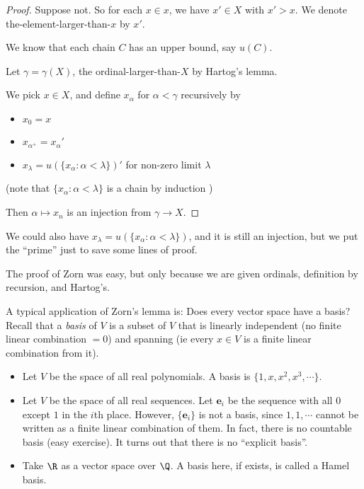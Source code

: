 \documentclass[a4paper]{article}
\begin{document}
\begin{proof}
  Suppose not. So for each $x\in x$, we have $x'\in X$ with $x' > x$. We denote the-element-larger-than-$x$ by $x'$.

  We know that each chain $C$ has an upper bound, say $u(C)$.

  Let $\gamma = \gamma(X)$, the ordinal-larger-than-$X$ by Hartog's lemma.

  We pick $x\in X$, and define $x_\alpha$ for $\alpha < \gamma$ recursively by
  \begin{itemize}
    \item $x_0 = x$
    \item $x_{\alpha^+} = x_\alpha'$
    \item $x_{\lambda} = u(\{x_\alpha: \alpha < \lambda\})'$ for non-zero limit $\lambda$
  \end{itemize}
  (note that $\{x_\alpha: \alpha < \lambda\}$ is a chain by induction )

  Then $\alpha \mapsto x_n$ is an injection from $\gamma\to X$.
\end{proof}
\note We could also have $x_\lambda = u(\{x_\alpha : \alpha < \lambda\})$, and it is still an injection, but we put the ``prime'' just to save some lines of proof.

\note The proof of Zorn was easy, but only because we are given ordinals, definition by recursion, and Hartog's.

A typical application of Zorn's lemma is: Does every vector space have a basis? Recall that a \emph{basis} of $V$ is a subset of $V$ that is linearly independent (no finite linear combination $= 0$) and spanning (ie every $x\in V$ is a finite linear combination from it).

\begin{eg}\leavevmode
  \begin{itemize}
    \item Let $V$ be the space of all real polynomials. A basis is $\{1, x, x^2, x^3, \cdots\}$.
    \item Let $V$ be the space of all real sequences. Let $\mathbf{e}_i$ be the sequence with all $0$ except $1$ in the $i$th place. However, $\{\mathbf{e}_i\}$ is not a basis, since $1, 1, \cdots$ cannot be written as a finite linear combination of them. In fact, there is no countable basis (easy exercise). It turns out that there is no ``explicit basis''.
    \item Take $\R$ as a vector space over $\Q$. A basis here, if exists, is called a Hamel basis.
  \end{itemize}
\end{eg}
\end{document}
